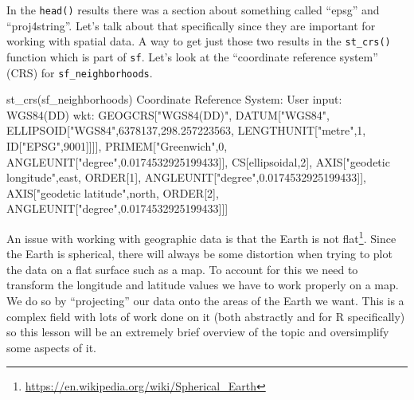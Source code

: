 \documentclass[
]{krantz}
\makeatletter
\newenvironment{Shaded}{\begin{snugshade}}{\end{snugshade}}
\newcommand{\DecValTok}[1]{\textcolor[rgb]{0.06,0.06,0.06}{#1}}
\newcommand{\FloatTok}[1]{\textcolor[rgb]{0.06,0.06,0.06}{#1}}
\newcommand{\FunctionTok}[1]{\textcolor[rgb]{0,0,0}{#1}}
\newcommand{\NormalTok}[1]{#1}
\newcommand{\SpecialCharTok}[1]{\textcolor[rgb]{0,0,0}{#1}}
\newcommand{\StringTok}[1]{\textcolor[rgb]{0.5,0.5,0.5}{#1}}
\renewcommand{\href}[2]{#2\footnote{\url{#1}}}
\newenvironment{kframe}{%
\medskip{}
\setlength{\fboxsep}{.8em}
 \def\at@end@of@kframe{}%
 \ifinner\ifhmode%
  \def\at@end@of@kframe{\end{minipage}}%
  \begin{minipage}{\columnwidth}%
 \fi\fi%
 \def\FrameCommand##1{\hskip\@totalleftmargin \hskip-\fboxsep
 \colorbox{shadecolor}{##1}\hskip-\fboxsep
     \hskip-\linewidth \hskip-\@totalleftmargin \hskip\columnwidth}%
 \MakeFramed {\advance\hsize-\width
   \@totalleftmargin\z@ \linewidth\hsize
   \@setminipage}}%
 {\par\unskip\endMakeFramed%
 \at@end@of@kframe}
\renewenvironment{Shaded}{\begin{kframe}}{\end{kframe}}
\makeatother
\begin{document}
In the \texttt{head()} results there was a section about something called ``epsg'' and ``proj4string''. Let's talk about that specifically since they are important for working with spatial data. A way to get just those two results in the \texttt{st\_crs()} function which is part of \texttt{sf}. Let's look at the ``coordinate reference system'' (CRS) for \texttt{sf\_neighborhoods}.

\begin{Shaded}
\begin{Highlighting}[]
\FunctionTok{st\_crs}\NormalTok{(sf\_neighborhoods)}
\NormalTok{Coordinate Reference System}\SpecialCharTok{:}
\NormalTok{  User input}\SpecialCharTok{:} \FunctionTok{WGS84}\NormalTok{(DD) }
\NormalTok{  wkt}\SpecialCharTok{:}
\NormalTok{GEOGCRS[}\StringTok{"WGS84(DD)"}\NormalTok{,}
\NormalTok{    DATUM[}\StringTok{"WGS84"}\NormalTok{,}
\NormalTok{        ELLIPSOID[}\StringTok{"WGS84"}\NormalTok{,}\DecValTok{6378137}\NormalTok{,}\FloatTok{298.257223563}\NormalTok{,}
\NormalTok{            LENGTHUNIT[}\StringTok{"metre"}\NormalTok{,}\DecValTok{1}\NormalTok{,}
\NormalTok{                ID[}\StringTok{"EPSG"}\NormalTok{,}\DecValTok{9001}\NormalTok{]]]],}
\NormalTok{    PRIMEM[}\StringTok{"Greenwich"}\NormalTok{,}\DecValTok{0}\NormalTok{,}
\NormalTok{        ANGLEUNIT[}\StringTok{"degree"}\NormalTok{,}\FloatTok{0.0174532925199433}\NormalTok{]],}
\NormalTok{    CS[ellipsoidal,}\DecValTok{2}\NormalTok{],}
\NormalTok{        AXIS[}\StringTok{"geodetic longitude"}\NormalTok{,east,}
\NormalTok{            ORDER[}\DecValTok{1}\NormalTok{],}
\NormalTok{            ANGLEUNIT[}\StringTok{"degree"}\NormalTok{,}\FloatTok{0.0174532925199433}\NormalTok{]],}
\NormalTok{        AXIS[}\StringTok{"geodetic latitude"}\NormalTok{,north,}
\NormalTok{            ORDER[}\DecValTok{2}\NormalTok{],}
\NormalTok{            ANGLEUNIT[}\StringTok{"degree"}\NormalTok{,}\FloatTok{0.0174532925199433}\NormalTok{]]]}
\end{Highlighting}
\end{Shaded}

An issue with working with geographic data is that \href{https://en.wikipedia.org/wiki/Spherical_Earth}{the Earth is not flat}. Since the Earth is spherical, there will always be some distortion when trying to plot the data on a flat surface such as a map. To account for this we need to transform the longitude and latitude values we have to work properly on a map. We do so by ``projecting'' our data onto the areas of the Earth we want. This is a complex field with lots of work done on it (both abstractly and for R specifically) so this lesson will be an extremely brief overview of the topic and oversimplify some aspects of it.
\end{document}
